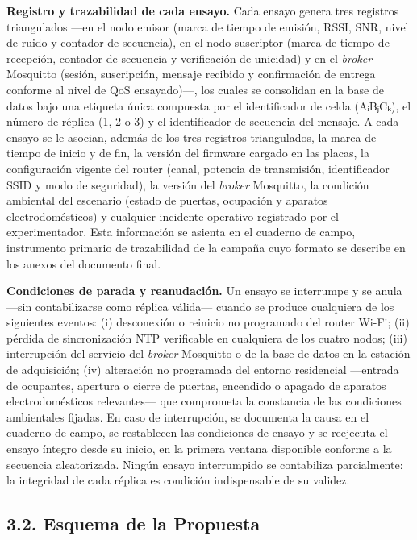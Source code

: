 \documentclass[
  12pt,
]{article}
\begin{document}
\textbf{Registro y trazabilidad de cada ensayo.} Cada ensayo genera tres
registros triangulados —en el nodo emisor (marca de tiempo de emisión,
RSSI, SNR, nivel de ruido y contador de secuencia), en el nodo
suscriptor (marca de tiempo de recepción, contador de secuencia y
verificación de unicidad) y en el \emph{broker} Mosquitto (sesión,
suscripción, mensaje recibido y confirmación de entrega conforme al
nivel de QoS ensayado)—, los cuales se consolidan en la base de datos
bajo una etiqueta única compuesta por el identificador de celda
(AᵢBⱼCₖ), el número de réplica (1, 2 o 3) y el identificador de
secuencia del mensaje. A cada ensayo se le asocian, además de los tres
registros triangulados, la marca de tiempo de inicio y de fin, la
versión del firmware cargado en las placas, la configuración vigente del
router (canal, potencia de transmisión, identificador SSID y modo de
seguridad), la versión del \emph{broker} Mosquitto, la condición
ambiental del escenario (estado de puertas, ocupación y aparatos
electrodomésticos) y cualquier incidente operativo registrado por el
experimentador. Esta información se asienta en el cuaderno de campo,
instrumento primario de trazabilidad de la campaña cuyo formato se
describe en los anexos del documento final.

\textbf{Condiciones de parada y reanudación.} Un ensayo se interrumpe y
se anula —sin contabilizarse como réplica válida— cuando se produce
cualquiera de los siguientes eventos: (i) desconexión o reinicio no
programado del router Wi-Fi; (ii) pérdida de sincronización NTP
verificable en cualquiera de los cuatro nodos; (iii) interrupción del
servicio del \emph{broker} Mosquitto o de la base de datos en la
estación de adquisición; (iv) alteración no programada del entorno
residencial —entrada de ocupantes, apertura o cierre de puertas,
encendido o apagado de aparatos electrodomésticos relevantes— que
comprometa la constancia de las condiciones ambientales fijadas. En caso
de interrupción, se documenta la causa en el cuaderno de campo, se
restablecen las condiciones de ensayo y se reejecuta el ensayo íntegro
desde su inicio, en la primera ventana disponible conforme a la
secuencia aleatorizada. Ningún ensayo interrumpido se contabiliza
parcialmente: la integridad de cada réplica es condición indispensable
de su validez.

\subsection{3.2. Esquema de la Propuesta}\label{esquema-de-la-propuesta}
\end{document}
